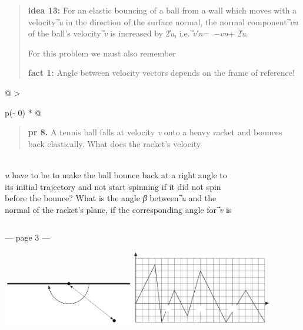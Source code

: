 \documentclass[
]{article}
\begin{document}
\begin{quote}
\textbf{idea 13:} For an elastic bouncing of a ball from a wall which
moves with a velocity \emph{⃗u} in the direction of the surface normal,
the normal component \emph{⃗vn} of the ball's velocity \emph{⃗v} is
increased by 2\emph{⃗u}, i.e. \emph{⃗v′n}=\emph{~−⃗vn}+ 2\emph{⃗u}.

For this problem we must also remember

\textbf{fact 1:} Angle between velocity vectors depends on the frame of
reference!
\end{quote}

\begin{longtable}[]{@{}
  >{\raggedright\arraybackslash}p{(\columnwidth - 0\tabcolsep) * }@{}}
\toprule
\begin{minipage}[b]{\linewidth}\raggedright
\begin{quote}
\textbf{pr 8.} A tennis ball falls at velocity \emph{v} onto a heavy
racket and bounces back elastically. What does the racket's velocity
\end{quote}
\end{minipage} \\
\midrule
\endhead
\emph{u} have to be to make the ball bounce back at a right angle to \\
its initial trajectory and not start spinning if it did not spin \\
before the bounce? What is the angle \emph{β} between \emph{⃗u} and
the \\
normal of the racket's plane, if the corresponding angle for \emph{⃗v}
is \\
\bottomrule
\end{longtable}

\begin{longtable}[]{@{}l@{}}
\toprule
\endhead
 \\
\bottomrule
\end{longtable}

--- page 3 ---

\includegraphics[width=2.26389in,height=0.79167in]{7c2ba21d717249b59a8d5c87a07c8bb7/media/image1.png}\includegraphics[width=2.44444in,height=1.30556in]{7c2ba21d717249b59a8d5c87a07c8bb7/media/image2.png}
\end{document}
